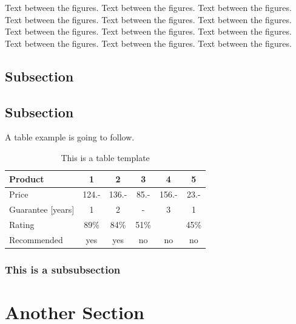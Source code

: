 Text between the figures.  Text between the figures. Text between the figures. Text between the figures.  Text between the figures. Text between the figures. Text between the figures.  Text between the figures. Text between the figures. Text between the figures.  Text between the figures. Text between the figures.

\subsection{Subsection}

\subsection{Subsection}

A table example is going to follow.

\begin{table}[H]
\centering
\caption{This is a table template}
\begin{tabular}{|l|c|c|c|c|c|}
\hline
Product & 1 & 2 & 3 & 4 & 5\\
\hline
Price & 124.- & 136.- & 85.- & 156.- & 23.-\\
Guarantee [years] & 1 & 2 & - & 3 & 1\\
Rating & 89\% & 84\% & 51\% & & 45\%\\
\hline
\hline
Recommended & yes & yes & no & no & no\\
\hline
\end{tabular}
\label{tab:template2}
\end{table}
\subsubsection{This is a subsubsection}
\section{Another Section}
